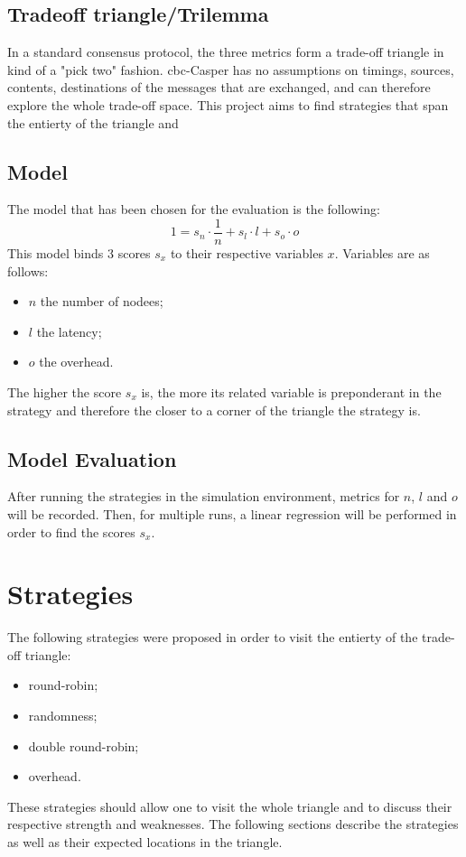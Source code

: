 \subsection{Tradeoff triangle/Trilemma}
In a standard consensus protocol, the three metrics form a trade-off triangle in
kind of a "pick two" fashion.  \gls{cbc}-Casper has no assumptions on timings,
sources, contents, destinations of the messages that are exchanged, and can
therefore explore the whole trade-off space. This project aims to find
strategies that span the entierty of the triangle and 

\subsection{Model}
The model that has been chosen for the evaluation is the following:
\[1 = s_n \cdot \frac{1}{n} + s_l\cdot l + s_o\cdot o\]
This model binds 3 scores \(s_x\) to their respective variables \(x\).
Variables are as follows:
\begin{itemize}
    \item \(n\) the number of nodees;
    \item \(l\) the latency;
    \item \(o\) the overhead.
\end{itemize}
The higher the score \(s_x\) is, the more its related variable is preponderant
in the strategy and therefore the closer to a corner of the triangle the strategy is.

\subsection{Model Evaluation}
After running the strategies in the simulation environment, metrics for \(n\),
\(l\) and \(o\) will be recorded. Then, for multiple runs, a linear regression
will be performed in order to find the scores \(s_x\).

\section{Strategies}
\label{sec:strategies}

The following strategies were proposed in order to visit the entierty of the
trade-off triangle:
\begin{itemize}
        \item round-robin;
        \item randomness;
        \item double round-robin;
        \item overhead.
\end{itemize}
These strategies should allow one to visit the whole triangle and to discuss
their respective strength and weaknesses. The following sections describe the
strategies as well as their expected locations in the triangle.

